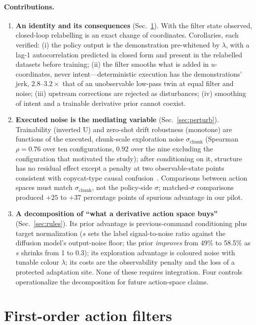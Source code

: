 \documentclass{article}
\newcommand{\schunk}{\sigma_{\mathrm{chunk}}}
\begin{document}
\paragraph{Contributions.}
\begin{enumerate}
\item \textbf{An identity and its consequences} (Sec.~\ref{sec:theory}). With the filter state observed, closed-loop relabelling is an exact change of coordinates. Corollaries, each verified: (i) the policy output is the demonstration pre-whitened by $\lambda$, with a lag-1 autocorrelation predicted in closed form and present in the relabelled datasets before training; (ii) the filter smooths what is added in $u$-coordinates, never intent---deterministic execution has the demonstrations' jerk, $2.8$--$3.2\times$ that of an unobservable low-pass twin at equal filter and noise; (iii) upstream corrections are rejected as disturbances; (iv) smoothing of intent and a trainable derivative prior cannot coexist.
\item \textbf{Executed noise is the mediating variable} (Sec.~\ref{sec:perturb}). Trainability (inverted U) and zero-shot drift robustness (monotone) are functions of the executed, chunk-scale exploration noise $\schunk$ (Spearman $\rho=0.76$ over ten configurations, $0.92$ over the nine excluding the configuration that motivated the study); after conditioning on it, structure has no residual effect except a penalty at two observable-state points consistent with copycat-type causal confusion~\citep{wen2020copycat}. Comparisons between action spaces must match $\schunk$, not the policy-side $\sigma$; matched-$\sigma$ comparisons produced $+25$ to $+37$ percentage points of spurious advantage in our pilot.
\item \textbf{A decomposition of ``what a derivative action space buys''} (Sec.~\ref{sec:rules}). Its prior advantage is previous-command conditioning plus target normalization ($s$ sets the label signal-to-noise ratio against the diffusion model's output-noise floor; the prior \emph{improves} from 49\% to 58.5\% as $s$ shrinks from 1 to 0.3); its exploration advantage is coloured noise with tunable colour $\lambda$; its costs are the observability penalty and the loss of a protected adaptation site. None of these requires integration. Four controls operationalize the decomposition for future action-space claims.
\end{enumerate}

\section{First-order action filters}
\label{sec:theory}
\end{document}
